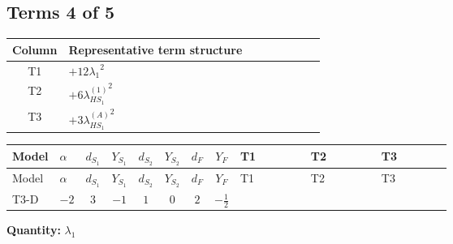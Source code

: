 \documentclass[8pt]{article}
\begin{document}
\begin{landscape}
\subsection*{Terms 4 of 5}
\begin{center}
\begin{tabular}{@{}c >{\raggedright\arraybackslash}p{0.82\linewidth}@{}}
\toprule
Column & Representative term structure \\
\midrule
T1 & \(\displaystyle +12 {\lambda_1}^2\) \\
\midrule
T2 & \(\displaystyle +6 {\lambda_{HS_1}^{(1)}}^2\) \\
\midrule
T3 & \(\displaystyle +3 {\lambda_{HS_1}^{(A)}}^2\) \\
\midrule
\bottomrule
\end{tabular}
\end{center}
\smallskip
\tiny
\begin{longtable}{@{}llcccccc >{\raggedright\arraybackslash}p{0.21\linewidth} >{\raggedright\arraybackslash}p{0.21\linewidth} >{\raggedright\arraybackslash}p{0.21\linewidth}@{}}
\toprule
Model & $\alpha$ & $d_{S_1}$ & $Y_{S_1}$ & $d_{S_2}$ & $Y_{S_2}$ & $d_F$ & $Y_F$ & T1 & T2 & T3 \\
\midrule
\endfirsthead
\toprule
Model & $\alpha$ & $d_{S_1}$ & $Y_{S_1}$ & $d_{S_2}$ & $Y_{S_2}$ & $d_F$ & $Y_F$ & T1 & T2 & T3 \\
\midrule
\endhead
T3-D & $-2$ & $3$ & $-1$ & $1$ & $0$ & $2$ & $-\frac{1}{2}$ & \scriptsize\adjustbox{max width=\linewidth}{$\begin{gathered} +12 {\lambda_1}^2\end{gathered}$} & \scriptsize\adjustbox{max width=\linewidth}{$\begin{gathered} +6 {\lambda_{HS_1}^{(1)}}^2\end{gathered}$} & \scriptsize\adjustbox{max width=\linewidth}{$\begin{gathered} +3 {\lambda_{HS_1}^{(A)}}^2\end{gathered}$} \\
\midrule
\bottomrule
\end{longtable}
\clearpage
\noindent\textbf{Quantity: }$\lambda_1$\par\smallskip

\end{landscape}
\end{document}
